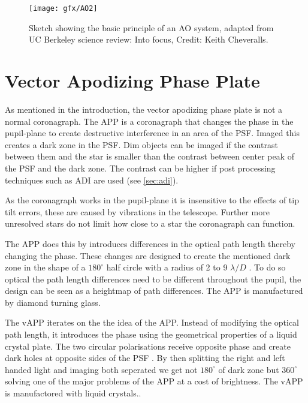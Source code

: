 \begin{figure}[H]
    \caption{Sketch showing the basic principle of an \ac{AO} system, adapted from UC Berkeley science review: Into focus, Credit: Keith Cheveralls.}
    \centering
    \texttt{[image: gfx/AO2]}
    \label{fig:ao}
\end{figure}





\section{Vector Apodizing Phase Plate}
\label{sec:vapp}

As mentioned in the introduction, the vector apodizing phase plate is not a normal coronagraph. The \ac{APP} is a coronagraph that changes the phase in the pupil-plane to create destructive interference in an area of the \ac{PSF}. Imaged this creates a dark zone in the \ac{PSF}. Dim objects can be imaged if the contrast between them and the star is smaller than the contrast between center peak of the \ac{PSF} and the dark zone. The contrast can be higher if post processing techniques such as \ac*{ADI} are used (see \autoref{sec:adi}).

As the coronagraph works in the pupil-plane it is insensitive to the effects of tip tilt errors, these are caused by vibrations in the telescope. Further more unresolved stars do not limit how close to a star the coronagraph can function.

The \ac{APP} does this by introduces differences in the optical path length thereby changing the phase. These changes are designed to create the mentioned dark zone in the shape of a $180^\circ$ half circle with a radius of 2 to 9 $\lambda/D$ \cite{vapp_doelman}. To do so optical the path length differences need to be different throughout the pupil, the design can be seen as a heightmap of path differences. The \ac{APP} is manufactured by diamond turning glass. 

The \ac{vAPP} iterates on the the idea of the APP. Instead of modifying the optical path length, it introduces the phase using the geometrical properties of a liquid crystal plate. The two circular polarisations receive opposite phase and create dark holes at opposite sides of the \ac{PSF} \cite{vapp_snik} \cite{vapp_otten} \cite{vapp_doelman}. By then splitting the right and left handed light and imaging both seperated we get not $180^\circ$ of dark zone but $360^\circ$ solving one of the major problems of the \ac{APP} at a cost of brightness. The \ac{vAPP} is manufactored with liquid crystals..






